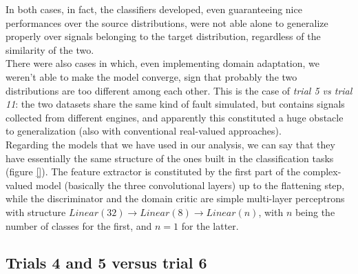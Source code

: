\documentclass[../main.tex]{subfiles}
\begin{document}
In both cases, in fact, the classifiers developed, even guaranteeing nice performances over the source distributions, were not able alone to generalize properly over signals belonging to the target distribution, regardless of the similarity of the two.\\
There were also cases in which, even implementing domain adaptation, we weren't able to make the model converge, sign that probably the two distributions are too different among each other. This is the case of \textit{trial 5 vs trial 11}: the two datasets share the same kind of fault simulated, but contains signals collected from different engines, and apparently this constituted a huge obstacle to generalization (also with conventional real-valued approaches).\\
Regarding the models that we have used in our analysis, we can say that they have essentially the same structure of the ones built in the classification tasks (figure \ref{}). The feature extractor is constituted by the first part of the complex-valued model (basically the three convolutional layers) up to the flattening step, while the discriminator and the domain critic are simple multi-layer perceptrons with structure $Linear(32)\to Linear(8)\to Linear(n)$, with $n$ being the number of classes for the first, and $n=1$ for the latter.
 
\subsection*{Trials 4 and 5 versus trial 6}
\end{document}
